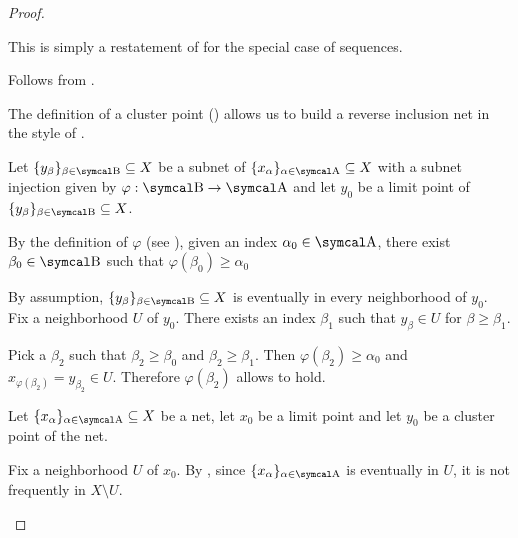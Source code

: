 \begin{proof}\mbox{}
  \begin{description}
     This is simply a restatement of  for the special case of sequences.

     Follows from .

    \mbox{}
    \begin{description}
      \Implies The definition of a cluster point () allows us to build a reverse inclusion net in the style of .

      \ImpliedBy Let \( \{ y_\beta \}_{\beta \in \CB} \subseteq X \) be a subnet of \( \{ x_\al \}_{\al \in \CA} \subseteq X \) with a subnet injection given by \( \varphi: \CB \to \CA \) and let \( y_0 \) be a limit point of \( \{ y_\beta \}_{\beta \in \CB} \subseteq X \).

      By the definition of \( \varphi \) (see ), given an index \( \alpha_0 \in \CA \), there exist \( \beta_0 \in \CB \) such that \( \varphi(\beta_0) \geq \alpha_0 \)

      By assumption, \( \{ y_\beta \}_{\beta \in \CB} \subseteq X \) is eventually in every neighborhood of \( y_0 \). Fix a neighborhood \( U \) of \( y_0 \). There exists an index \( \beta_1 \) such that \( y_\beta \in U \) for \( \beta \geq \beta_1 \).

      Pick a \( \beta_2 \) such that \( \beta_2 \geq \beta_0 \) and \( \beta_2 \geq \beta_1 \). Then \( \varphi(\beta_2) \geq \alpha_0 \) and \( x_{\varphi(\beta_2)} = y_{\beta_2} \in U \). Therefore \( \varphi(\beta_2) \) allows  to hold.
    \end{description}

     Let \( \{ x_\al \}_{\al \in \CA} \subseteq X \) be a net, let \( x_0 \) be a limit point and let \( y_0 \) be a cluster point of the net.

    Fix a neighborhood \( U \) of \( x_0 \). By , since \( \{ x_\al \}_{\al \in \CA} \) is eventually in \( U \), it is not frequently in \( X \setminus U \).


\end{description}
\end{proof}
